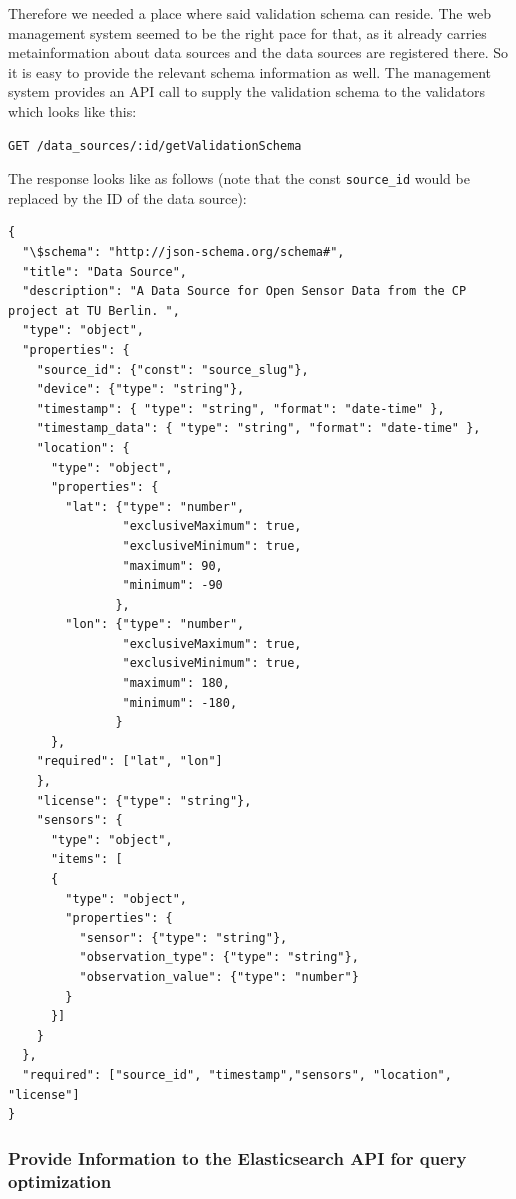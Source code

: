 Therefore we needed a place where said validation schema can reside. The
web management system seemed to be the right pace for that, as it
already carries metainformation about data sources and the data sources
are registered there. So it is easy to provide the relevant schema
information as well. The management system provides an API call to
supply the validation schema to the validators which looks like this:

\begin{verbatim}
GET /data_sources/:id/getValidationSchema
\end{verbatim}

The response looks like as follows (note that the const
\texttt{source\_id} would be replaced by the ID of the data source):

\begin{verbatim}
{
  "\$schema": "http://json-schema.org/schema#",
  "title": "Data Source",
  "description": "A Data Source for Open Sensor Data from the CP project at TU Berlin. ",
  "type": "object",
  "properties": {
    "source_id": {"const": "source_slug"},
    "device": {"type": "string"},
    "timestamp": { "type": "string", "format": "date-time" },
    "timestamp_data": { "type": "string", "format": "date-time" },
    "location": {
      "type": "object",
      "properties": {
        "lat": {"type": "number",
                "exclusiveMaximum": true,
                "exclusiveMinimum": true,
                "maximum": 90,
                "minimum": -90
               },
        "lon": {"type": "number",
                "exclusiveMaximum": true,
                "exclusiveMinimum": true,
                "maximum": 180,
                "minimum": -180,
               }
      },
    "required": ["lat", "lon"]
    },
    "license": {"type": "string"},
    "sensors": {
      "type": "object",
      "items": [
      {
        "type": "object",
        "properties": {
          "sensor": {"type": "string"},
          "observation_type": {"type": "string"},
          "observation_value": {"type": "number"}
        }
      }]
    }
  },
  "required": ["source_id", "timestamp","sensors", "location", "license"]
}
\end{verbatim}

\subsubsection{Provide Information to the Elasticsearch API for query
optimization}\label{provide-information-to-the-elasticsearch-api-for-query-optimization}

